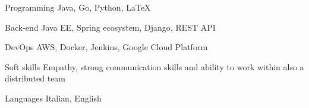

\begin{cvskills}

  \cvskill
    {Programming} %
    {Java, Go, Python, \LaTeX} %

  \cvskill
    {Back-end} %
    {Java EE, Spring ecosystem, Django, REST API} %

  \cvskill
  {DevOps} %
  {AWS, Docker, Jenkins, Google Cloud Platform} %

  \cvskill
    {Soft skills} %
    {Empathy, strong communication skills and ability to work within also a distributed team} %

  \cvskill
    {Languages} %
    {Italian, English} %

\end{cvskills}
